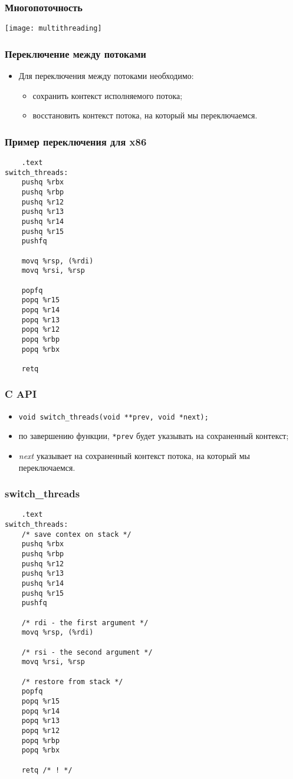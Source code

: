 \begin{frame}
\frametitle{Многопоточность}
\texttt{[image: multithreading]}
\end{frame}

\begin{frame}
\frametitle{Переключение между потоками}
\begin{itemize}
    \item<1->Для переключения между потоками необходимо:
    \begin{itemize}
        \item<2->сохранить контекст исполняемого потока;
        \item<3->восстановить контекст потока, на который мы переключаемся.
    \end{itemize}
\end{itemize}
\end{frame}

\begin{frame}[fragile]
\frametitle{Пример переключения для x86}
\begin{lstlisting}
    .text
switch_threads:
    pushq %rbx
    pushq %rbp
    pushq %r12
    pushq %r13
    pushq %r14
    pushq %r15
    pushfq

    movq %rsp, (%rdi)
    movq %rsi, %rsp

    popfq
    popq %r15
    popq %r14
    popq %r13
    popq %r12
    popq %rbp
    popq %rbx

    retq
\end{lstlisting}
\end{frame}

\begin{frame}[fragile]
\frametitle{C API}
\begin{itemize}
    \item \lstinline|void switch_threads(void **prev, void *next);|
    \item<1->по завершению функции, \lstinline|*prev| будет указывать
             на сохраненный контекст;
    \item<2->\emph{next} указывает на сохраненный контекст потока, на
             который мы переключаемся.
\end{itemize}
\end{frame}

\begin{frame}[fragile]
\frametitle{switch\_threads}
\begin{lstlisting}
    .text
switch_threads:
    /* save contex on stack */
    pushq %rbx
    pushq %rbp
    pushq %r12
    pushq %r13
    pushq %r14
    pushq %r15
    pushfq

    /* rdi - the first argument */
    movq %rsp, (%rdi)

    /* rsi - the second argument */
    movq %rsi, %rsp

    /* restore from stack */
    popfq
    popq %r15
    popq %r14
    popq %r13
    popq %r12
    popq %rbp
    popq %rbx

    retq /* ! */
\end{lstlisting}
\end{frame}

